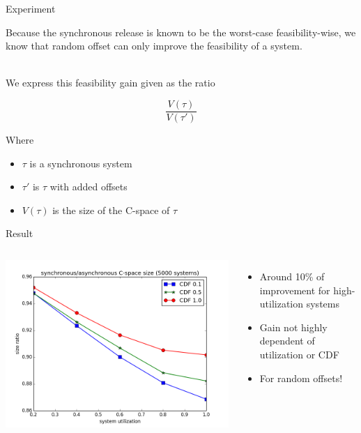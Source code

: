 \documentclass{beamer}
\begin{document}
    \begin{frame}{Experiment}

        Because the synchronous release is known to be the worst-case feasibility-wise, we know that random offset can only improve the feasibility of a system.

        ~\\

        We express this feasibility gain given as the ratio

        $$\frac{V(\tau)}{V(\tau')}$$

        Where
        \begin{itemize}
            \item $\tau$ is a synchronous system
            \item $\tau'$ is $\tau$ with added offsets
            \item $V(\tau)$ is the size of the C-space of $\tau$
        \end{itemize}

    \end{frame}

    \begin{frame}{Result}

        \begin{columns}[c]


            \includegraphics[width=1.2\textwidth]{figs/sizeratio.png}


            \begin{itemize}
                \item Around 10\% of improvement for high-utilization systems
                \item Gain not highly dependent of utilization or CDF
                \item For random offsets!
            \end{itemize}

        \end{columns}

    \end{frame}
\end{document}

